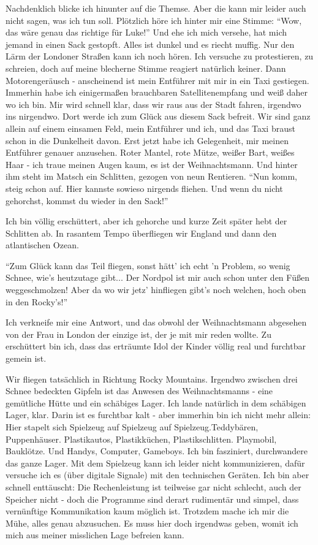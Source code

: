 Nachdenklich blicke ich hinunter auf die Themse. Aber die kann mir leider auch nicht sagen, was ich tun soll. Plötzlich höre ich hinter mir eine Stimme: "`Wow, das wäre genau das richtige für Luke!"' Und ehe ich mich versehe, hat mich jemand in einen Sack gestopft. Alles ist dunkel und es riecht muffig. Nur den Lärm der Londoner Straßen kann ich noch hören. Ich versuche zu protestieren, zu schreien, doch auf meine blecherne Stimme reagiert natürlich keiner. Dann Motorengeräusch - anscheinend ist mein Entführer mit mir in ein Taxi gestiegen. Immerhin habe ich einigermaßen brauchbaren Satellitenempfang und weiß daher wo ich bin. Mir wird schnell klar, dass wir raus aus der Stadt fahren, irgendwo ins nirgendwo. Dort werde ich zum Glück aus diesem Sack befreit. Wir sind ganz allein auf einem einsamen Feld, mein Entführer und ich, und das Taxi braust schon in die Dunkelheit davon. Erst jetzt habe ich Gelegenheit, mir meinen Entführer genauer anzusehen. Roter Mantel, rote Mütze, weißer Bart, weißes Haar - ich traue meinen Augen kaum, es ist der Weihnachtsmann. Und hinter ihm steht im Matsch ein Schlitten, gezogen von neun Rentieren. "`Nun komm, steig schon auf. Hier kannste sowieso nirgends fliehen. Und wenn du nicht gehorchst, kommst du wieder in den Sack!"'

Ich bin völlig erschüttert, aber ich gehorche und kurze Zeit später hebt der Schlitten ab. In rasantem Tempo überfliegen wir England und dann den atlantischen Ozean.

"`Zum Glück kann das Teil fliegen, sonst hätt' ich echt 'n Problem, so wenig Schnee, wie's heutzutage gibt... Der Nordpol ist mir auch schon unter den Füßen weggeschmolzen! Aber da wo wir jetz' hinfliegen gibt's noch welchen, hoch oben in den Rocky's!"'

Ich verkneife mir eine Antwort, und das obwohl der Weihnachtsmann abgesehen von der Frau in London der einzige ist, der je mit mir reden wollte. Zu erschüttert bin ich, dass das erträumte Idol der Kinder völlig real und furchtbar gemein ist.

Wir fliegen tatsächlich in Richtung Rocky Mountains. Irgendwo zwischen drei Schnee bedeckten Gipfeln ist das Anwesen des Weihnachtsmanns - eine gemütliche Hütte und ein schäbiges Lager. Ich lande natürlich in dem schäbigen Lager, klar. Darin ist es furchtbar kalt - aber immerhin bin ich nicht mehr allein: Hier stapelt sich Spielzeug auf Spielzeug auf Spielzeug.Teddybären, Puppenhäuser. Plastikautos, Plastikküchen, Plastikschlitten. Playmobil, Bauklötze. Und Handys, Computer, Gameboys. Ich bin fasziniert, durchwandere das ganze Lager. Mit dem Spielzeug kann ich leider nicht kommunizieren, dafür versuche ich es (über digitale Signale) mit den technischen Geräten. Ich bin aber schnell enttäuscht: Die Rechenleistung ist teilweise gar nicht schlecht, auch der Speicher nicht  - doch die Programme sind derart rudimentär und simpel, dass vernünftige Kommunikation kaum möglich ist. Trotzdem mache ich mir die Mühe, alles genau abzusuchen. Es muss hier doch irgendwas geben, womit ich mich aus meiner misslichen Lage befreien kann.